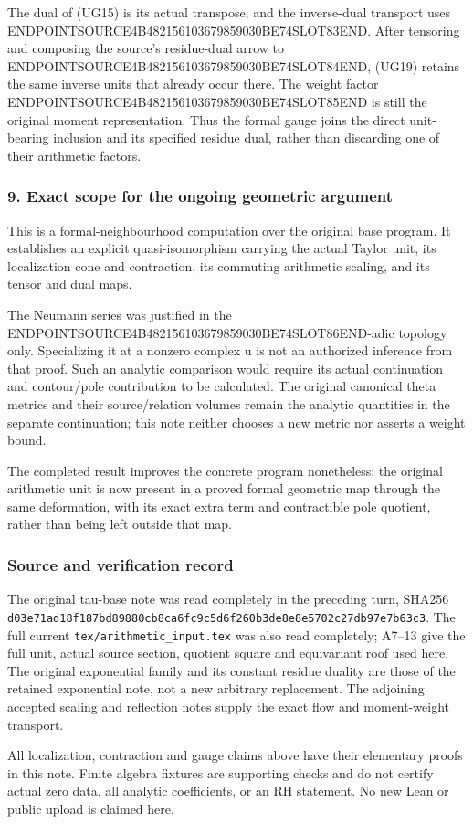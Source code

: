 The dual of (UG15) is its actual transpose, and the inverse-dual transport uses ENDPOINTSOURCE4B482156103679859030BE74SLOT83END. After tensoring and composing the source's residue-dual arrow to ENDPOINTSOURCE4B482156103679859030BE74SLOT84END, (UG19) retains the same inverse units that already occur there. The weight factor ENDPOINTSOURCE4B482156103679859030BE74SLOT85END is still the original moment representation. Thus the formal gauge joins the direct unit-bearing inclusion and its specified residue dual, rather than discarding one of their arithmetic factors.

\subsubsection{9. Exact scope for the ongoing geometric argument}\label{endpoint-f1_unit_gauge--exact-scope-for-the-ongoing-geometric-argument}

This is a formal-neighbourhood computation over the original base program. It establishes an explicit quasi-isomorphism carrying the actual Taylor unit, its localization cone and contraction, its commuting arithmetic scaling, and its tensor and dual maps.

The Neumann series was justified in the ENDPOINTSOURCE4B482156103679859030BE74SLOT86END-adic topology only. Specializing it at a nonzero complex u is not an authorized inference from that proof. Such an analytic comparison would require its actual continuation and contour/pole contribution to be calculated. The original canonical theta metrics and their source/relation volumes remain the analytic quantities in the separate continuation; this note neither chooses a new metric nor asserts a weight bound.

The completed result improves the concrete program nonetheless: the original arithmetic unit is now present in a proved formal geometric map through the same deformation, with its exact extra term and contractible pole quotient, rather than being left outside that map.

\subsubsection{Source and verification record}\label{endpoint-f1_unit_gauge--source-and-verification-record}

The original tau-base note was read completely in the preceding turn, SHA256 \texttt{d03e71ad18f187bd89880cb8ca6fc9c5d6f260b3de8e8e5702c27db97e7b63c3}. The full current \texttt{tex/arithmetic\_input.tex} was also read completely; A7--13 give the full unit, actual source section, quotient square and equivariant roof used here. The original exponential family and its constant residue duality are those of the retained exponential note, not a new arbitrary replacement. The adjoining accepted scaling and reflection notes supply the exact flow and moment-weight transport.

All localization, contraction and gauge claims above have their elementary proofs in this note. Finite algebra fixtures are supporting checks and do not certify actual zero data, all analytic coefficients, or an RH statement. No new Lean or public upload is claimed here.
